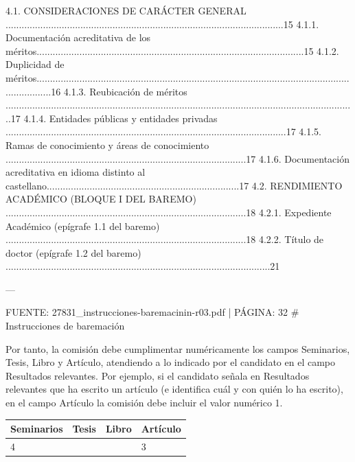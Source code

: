 \documentclass{article}
\begin{document}
\begin{itemize}
\begin{itemize}
\begin{scriptsize}
                  4.1. CONSIDERACIONES DE CARÁCTER GENERAL ........................................................................................................15
                  4.1.1. Documentación acreditativa de los méritos....................................................................................................15
                  4.1.2. Duplicidad de méritos......................................................................................................................................16
                  4.1.3. Reubicación de méritos ...................................................................................................................................17
                  4.1.4. Entidades públicas y entidades privadas .........................................................................................................17
                  4.1.5. Ramas de conocimiento y áreas de conocimiento ..........................................................................................17
                  4.1.6. Documentación acreditativa en idioma distinto al castellano........................................................................17
                  4.2. RENDIMIENTO ACADÉMICO (BLOQUE I DEL BAREMO) ..........................................................................................18
                  4.2.1. Expediente Académico (epígrafe 1.1 del baremo) ..........................................................................................18
                  4.2.2. Título de doctor (epígrafe 1.2 del baremo) ...................................................................................................21

                  ---

                  FUENTE: 27831\_instrucciones-baremacinin-r03.pdf | PÁGINA: 32
                  \# Instrucciones de baremación

                  Por tanto, la comisión debe cumplimentar numéricamente los campos Seminarios, Tesis, Libro y Artículo, atendiendo a lo indicado por el candidato en el campo Resultados relevantes. Por ejemplo, si el candidato señala en Resultados relevantes que ha escrito un artículo (e identifica cuál y con quién lo ha escrito), en el campo Artículo la comisión debe incluir el valor numérico 1.

                  \vspace{0.4cm}
                  \begin{table}[h!]\centering\renewcommand{\arraystretch}{1.3}
                    \begin{tabular}{|p{}|p{}|p{}|p{}|}\hline
                      Seminarios & Tesis & Libro & Artículo \\\hline
                      4          &       &       & 3        \\\hline
                    \end{tabular}\end{table}
                  \vspace{0.4cm}


\end{scriptsize}
\end{itemize}
\end{itemize}
\end{document}
